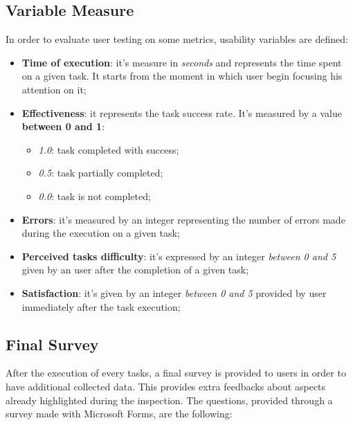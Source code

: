 \subsection{Variable Measure}
In order to evaluate user testing on some metrics, usability variables are defined:
\begin{itemize}
\item \textbf{Time of execution}: it's measure in \textit{seconds} and represents the time spent on a given task. It starts from the moment in which user begin focusing his attention on it;
\item \textbf{Effectiveness}: it represents the task success rate. It's measured by a value \textbf{between 0 and 1}:
    \begin{itemize} 
    \item \textit{1.0}: task completed with success;
    \item \textit{0.5}: task partially completed;
    \item \textit{0.0}: task is not completed;
    \end{itemize}
\item \textbf{Errors}: it's measured by an integer representing the number of errors made during the execution on a given task;
\item \textbf{Perceived tasks difficulty}: it's expressed by an integer \textit{between 0 and 5} given by an user after the completion of a given task;
\item \textbf{Satisfaction}: it's given by an integer \textit{between 0 and 5} provided by user immediately after the task execution;
\end{itemize}


\subsection{Final Survey}
After the execution of every tasks, a final survey is provided to users in order to have additional collected data. This provides extra feedbacks about aspects already highlighted during the inspection.
The questions, provided through a survey made with Microsoft Forms, are the following:
